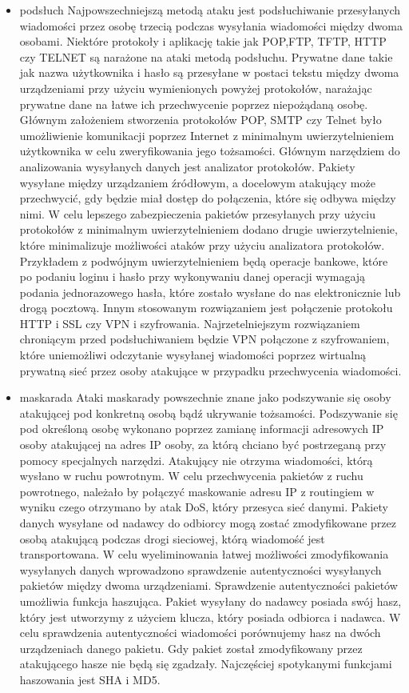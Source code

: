 \documentclass[12p]{article}
\begin{document}
\begin{itemize}
\item podsłuch
\newline Najpowszechniejszą metodą ataku jest podsłuchiwanie przesyłanych wiadomości przez osobę trzecią podczas wysyłania wiadomości między dwoma osobami. Niektóre protokoły i aplikację takie jak POP,FTP, TFTP, HTTP czy TELNET są narażone na ataki metodą podsłuchu. Prywatne dane takie jak nazwa użytkownika i hasło są przesyłane w postaci tekstu między dwoma urządzeniami przy użyciu wymienionych powyżej protokołów, narażając prywatne dane na łatwe ich przechwycenie poprzez niepożądaną osobę. Głównym założeniem stworzenia protokołów POP, SMTP czy Telnet było umożliwienie komunikacji poprzez Internet  z minimalnym uwierzytelnieniem użytkownika w celu zweryfikowania jego tożsamości. Głównym narzędziem do analizowania wysyłanych danych jest analizator protokołów. Pakiety wysyłane między urządzaniem źródłowym, a docelowym atakujący może przechwycić, gdy będzie miał dostęp do połączenia, które się odbywa między nimi. W celu lepszego zabezpieczenia pakietów przesyłanych przy użyciu protokołów z minimalnym uwierzytelnieniem dodano drugie uwierzytelnienie, które minimalizuje możliwości ataków przy użyciu analizatora protokołów. Przykładem z podwójnym uwierzytelnieniem będą operacje bankowe, które po podaniu loginu i hasło przy wykonywaniu danej operacji wymagają podania jednorazowego hasła, które zostało wysłane do nas elektronicznie lub drogą pocztową. Innym stosowanym rozwiązaniem jest połączenie protokołu  HTTP i SSL czy VPN i szyfrowania. Najrzetelniejszym rozwiązaniem chroniącym przed podsłuchiwaniem będzie VPN połączone z szyfrowaniem, które uniemożliwi odczytanie wysyłanej wiadomości poprzez wirtualną prywatną sieć przez osoby atakujące w przypadku przechwycenia wiadomości.
\item maskarada
\newline Ataki maskarady powszechnie znane jako podszywanie się osoby atakującej pod konkretną osobą bądź ukrywanie tożsamości. Podszywanie się pod określoną osobę wykonano poprzez zamianę informacji adresowych IP osoby atakującej na adres IP osoby, za którą chciano być postrzeganą przy pomocy specjalnych narzędzi. Atakujący nie otrzyma wiadomości, którą wysłano w ruchu powrotnym. W celu przechwycenia pakietów z ruchu powrotnego, należało by połączyć maskowanie adresu IP z routingiem w wyniku czego otrzymano by atak DoS, który przesyca sieć danymi. Pakiety danych wysyłane od nadawcy do odbiorcy mogą zostać zmodyfikowane przez osobą atakującą podczas drogi sieciowej, którą wiadomość jest transportowana. W celu wyeliminowania łatwej możliwości zmodyfikowania wysyłanych danych wprowadzono sprawdzenie autentyczności wysyłanych pakietów między dwoma urządzeniami. Sprawdzenie autentyczności pakietów umożliwia funkcja haszująca. Pakiet wysyłany do nadawcy posiada swój hasz, który jest utworzymy z użyciem klucza, który posiada odbiorca i nadawca. W celu sprawdzenia autentyczności wiadomości porównujemy hasz na dwóch urządzeniach danego pakietu. Gdy pakiet został zmodyfikowany przez atakującego hasze nie będą się zgadzały. Najczęściej spotykanymi funkcjami haszowania jest SHA i MD5.

\end{itemize}
\end{document}
